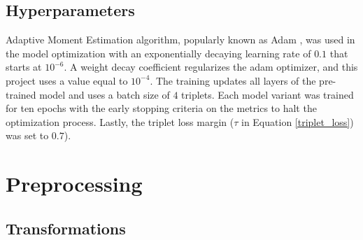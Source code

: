\subsection{Hyperparameters}\label{chap:5sec:hyper-param}

Adaptive Moment Estimation algorithm, popularly known as Adam \cite{kingma14adam}, was used in the model optimization with an exponentially decaying learning rate of \begin{math} 0.1 \end{math} that starts at \begin{math} {10}^{-6} \end{math}. A weight decay coefficient regularizes the adam optimizer, and this project uses a value equal to \begin{math} {10}^{-4} \end{math}. The training updates all layers of the pre-trained model and uses a batch size of \begin{math} 4 \end{math} triplets. Each model variant was trained for ten epochs with the early stopping criteria on the metrics to halt the optimization process. Lastly, the triplet loss margin (\begin{math} \tau \end{math} in Equation \eqref{triplet_loss}) was set to \begin{math} 0.7 \end{math}).

\section{Preprocessing}

\subsection{Transformations}

